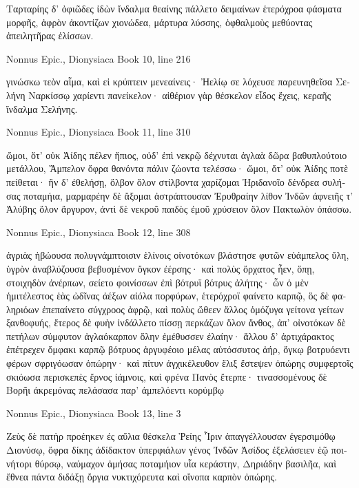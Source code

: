 \documentclass[12pt,letterpaper,twoside,final]{memoir}
\begin{document}
\begin{greek}
Ταρταρίης δ' ὀφιῶδες ἰδὼν ἴνδαλμα θεαίνης 
πάλλετο δειμαίνων ἑτερόχροα φάσματα μορφῆς, 
ἀφρὸν ἀκοντίζων χιονώδεα, μάρτυρα λύσσης, 
ὀφθαλμοὺς μεθύοντας ἀπειλητῆρας ἑλίσσων. 



Nonnus Epic., Dionysiaca 
Book 10, line 216

γινώσκω τεὸν αἷμα, καὶ εἰ κρύπτειν μενεαίνεις· 
Ἠελίῳ σε λόχευσε παρευνηθεῖσα Σελήνη 
Ναρκίσσῳ χαρίεντι πανείκελον· αἰθέριον γὰρ 
θέσκελον εἶδος ἔχεις, κεραῆς ἴνδαλμα Σελήνης. 



Nonnus Epic., Dionysiaca 
Book 11, line 310

ὤμοι, ὅτ' οὐκ Ἀίδης πέλεν ἤπιος, οὐδ' ἐπὶ νεκρῷ 
δέχνυται ἀγλαὰ δῶρα βαθυπλούτοιο μετάλλου, 
Ἄμπελον ὄφρα θανόντα πάλιν ζώοντα τελέσσω· 
ὤμοι, ὅτ' οὐκ Ἀίδης ποτὲ πείθεται· ἢν δ' ἐθελήσῃ, 
ὄλβον ὅλον στίλβοντα χαρίζομαι Ἠριδανοῖο 
δένδρεα συλήσας ποταμήια, μαρμαρέην δὲ 
ἄξομαι ἀστράπτουσαν Ἐρυθραίην λίθον Ἰνδῶν 
ἀφνειῆς τ' Ἀλύβης ὅλον ἄργυρον, ἀντὶ δὲ νεκροῦ 
παιδὸς ἐμοῦ χρύσειον ὅλον Πακτωλὸν ὀπάσσω. 



Nonnus Epic., Dionysiaca 
Book 12, line 308

ἀγριὰς ἡβώουσα πολυγνάμπτοισιν ἑλίνοις 
οἰνοτόκων βλάστησε φυτῶν εὐάμπελος ὕλη, 
ὑγρὸν ἀναβλύζουσα βεβυσμένον ὄγκον ἐέρσης· 
καὶ πολὺς ὄρχατος ἦεν, ὅπῃ, στοιχηδὸν ἀνέρπων, 
σείετο φοινίσσων ἐπὶ βότρυϊ βότρυς ἀλήτης· 
ὧν ὁ μὲν ἡμιτέλεστος ἑὰς ὠδῖνας ἀέξων 
αἰόλα πορφύρων, ἑτερόχροϊ φαίνετο καρπῷ, 
ὃς δὲ φαληριόων ἐπεπαίνετο σύγχροος ἀφρῷ, 
καὶ πολὺς ὤθεεν ἄλλος ὁμόζυγα γείτονα γείτων 
ξανθοφυής, ἕτερος δὲ φυὴν ἰνδάλλετο πίσσῃ 
περκάζων ὅλον ἄνθος, ἀπ' οἰνοτόκων δὲ πετήλων 
σύμφυτον ἀγλαόκαρπον ὅλην ἐμέθυσσεν ἐλαίην· 
ἄλλου δ' ἀρτιχάρακτος ἐπέτρεχεν ὄμφακι καρπῷ 
βότρυος ἀργυφέοιο μέλας αὐτόσσυτος ἀήρ, 
ὄγκῳ βοτρυόεντι φέρων σφριγόωσαν ὀπώρην· 
καὶ πίτυν ἀγχικέλευθον ἕλιξ ἔστεψεν ὀπώρης   
συμφερτοῖς σκιόωσα περισκεπὲς ἔρνος ἰάμνοις, 
καὶ φρένα Πανὸς ἔτερπε· τινασσομένους δὲ Βορῆι 
ἀκρεμόνας πελάσασα παρ' ἀμπελόεντι κορύμβῳ 




Nonnus Epic., Dionysiaca 
Book 13, line 3

Ζεὺς δὲ πατὴρ προέηκεν ἐς αὔλια θέσκελα Ῥείης 
Ἶριν ἀπαγγέλλουσαν ἐγερσιμόθῳ Διονύσῳ, 
ὄφρα δίκης ἀδίδακτον ὑπερφιάλων γένος Ἰνδῶν 
Ἀσίδος ἐξελάσειεν ἑῷ ποινήτορι θύρσῳ, 
ναύμαχον ἀμήσας ποταμήιον υἷα κεράστην, 
Δηριάδην βασιλῆα, καὶ ἔθνεα πάντα διδάξῃ 
ὄργια νυκτιχόρευτα καὶ οἴνοπα καρπὸν ὀπώρης. 




\end{greek}
\end{document}
